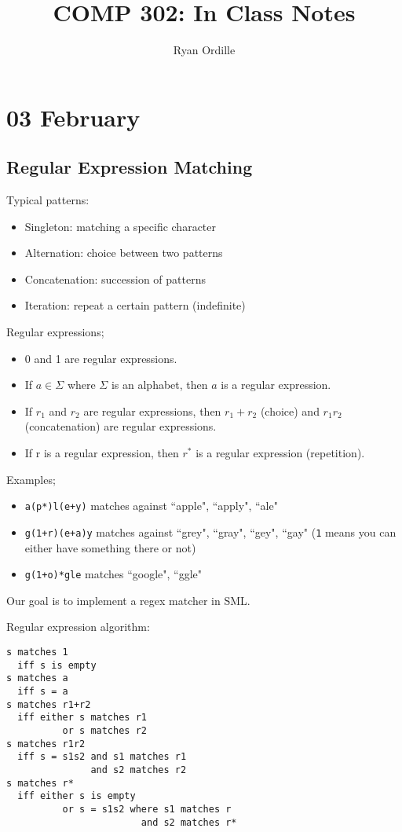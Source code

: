 \documentclass[11pt]{article}
\title{COMP 302: In Class Notes}
\author{Ryan Ordille}
\begin{document}
\maketitle


\section{03 February}
\subsection*{Regular Expression Matching}

Typical patterns:
\begin{itemize}
	\item Singleton: matching a specific character
	\item Alternation: choice between two patterns
	\item Concatenation: succession of patterns
	\item Iteration: repeat a certain pattern (indefinite)
\end{itemize}

Regular expressions;
\begin{itemize}
	\item 0 and 1 are regular expressions.
	\item If $a \in \Sigma$ where $\Sigma$ is an alphabet, then $a$ is a regular expression.
	\item If $r_1$ and $r_2$ are regular expressions, then $r_1 + r_2$ (choice) and $r_{1}r_{2}$ (concatenation) are regular expressions.
	\item If r is a regular expression, then $r^*$ is a regular expression (repetition).
\end{itemize}

Examples;
\begin{itemize}
	\item \verb~a(p*)l(e+y)~ matches against ``apple", ``apply", ``ale"
	\item \verb~g(1+r)(e+a)y~ matches against ``grey", ``gray", ``gey", ``gay" (\verb~1~ means you can either have something there or not)
	\item \verb~g(1+o)*gle~ matches ``google", ``ggle"
\end{itemize}

Our goal is to implement a regex matcher in SML.

Regular expression algorithm:
\begin{verbatim}
s matches 1
  iff s is empty
s matches a
  iff s = a
s matches r1+r2
  iff either s matches r1
          or s matches r2
s matches r1r2
  iff s = s1s2 and s1 matches r1
               and s2 matches r2
s matches r*
  iff either s is empty
          or s = s1s2 where s1 matches r
		                and s2 matches r*
\end{verbatim}
\end{document}
